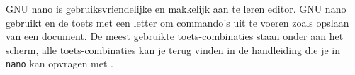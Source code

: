 GNU nano is gebruiksvriendelijke en makkelijk aan te leren editor. GNU nano gebruikt  en de  toets met een letter om commando's uit te voeren zoals opslaan van een document. De meest gebruikte toets-combinaties staan onder aan het scherm, alle toets-combinaties kan je terug vinden in de handleiding die je in \texttt{nano} kan opvragen met .

